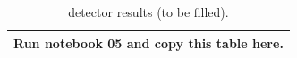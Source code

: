 \begin{table}[h]\centering\caption{detector results (to be filled).}\small\begin{tabular}{l}\toprule Run notebook 05 and copy this table here.\\\bottomrule\end{tabular}\end{table}
